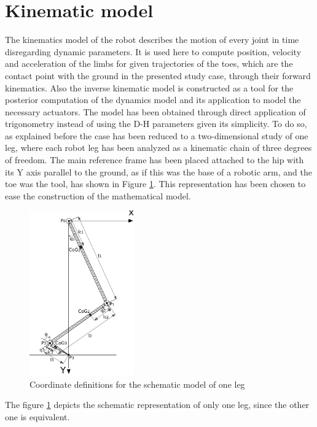 
\section{Kinematic model}
\label{sec_kinematic_model}
The kinematics model of the robot describes the motion of every joint in time disregarding dynamic parameters.
It is used here to compute position, velocity and acceleration of the limbs for given trajectories of the toes, which are the contact point with the ground in the presented study case, through their forward kinematics.
Also the inverse kinematic model is constructed as a tool for the posterior computation of the dynamics model and its application to model the necessary actuators.
The model has been obtained through direct application of trigonometry instead of using the D-H parameters given its simplicity.
To do so, as explained before the case has been reduced to a two-dimensional study of one leg, where each robot leg has been analyzed as a kinematic chain of three degrees of freedom.
The main reference frame has been placed attached to the hip with its Y axis parallel to the ground, as if this was the base of a robotic arm, and the toe was the tool, has shown in Figure \ref{fig:kinematics}.
This representation has been chosen to ease the construction of the mathematical model.
\begin{figure}[ht]
	\centering
	\includegraphics[width=0.4\textwidth]{figures/kinematics_model.pdf}
	\caption{Coordinate definitions for the schematic model of one leg}
	\label{fig:kinematics}
\end{figure}
The figure \ref{fig:kinematics} depicts the schematic representation of only one leg, since the other one is equivalent. 
